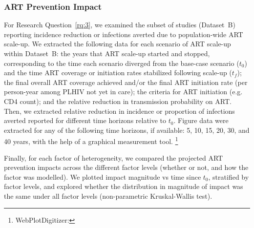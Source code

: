 \subsubsection{ART Prevention Impact}
\label{sss:meth:api} %
For Research Question~\ref{rq:3}, we examined the subset of studies (Dataset~B)
reporting incidence reduction or infections averted due to
population-wide ART scale-up.
We extracted the following data for each scenario of ART scale-up within Dataset~B:
the years that ART scale-up started and stopped, corresponding to
the time each scenario diverged from the base-case scenario ($t_0$) and
the time ART coverage or initiation rates stabilized following scale-up ($t_f$);
the final overall ART coverage achieved and/or
the final ART initiation rate (per person-year among PLHIV not yet in care);
the criteria for ART initiation (e.g. CD4 count);
and the relative reduction in transmission probability on ART.
Then, we extracted relative reduction in incidence or proportion of infections averted
reported for different time horizons relative to $t_0$.
Figure data were extracted for any of the following time horizons, if available:
5, 10, 15, 20, 30, and 40 years,
with the help of a graphical measurement tool.%
\footnote{WebPlotDigitizer: }
\par
Finally, for each factor of heterogeneity,
we compared the projected ART prevention impacts across
the different factor levels (whether or not, and how the factor was modelled).
We plotted impact magnitude vs time since $t_0$, stratified by factor levels,
and explored whether the distribution in magnitude of impact
was the same under all factor levels (non-parametric Kruskal-Wallis test).